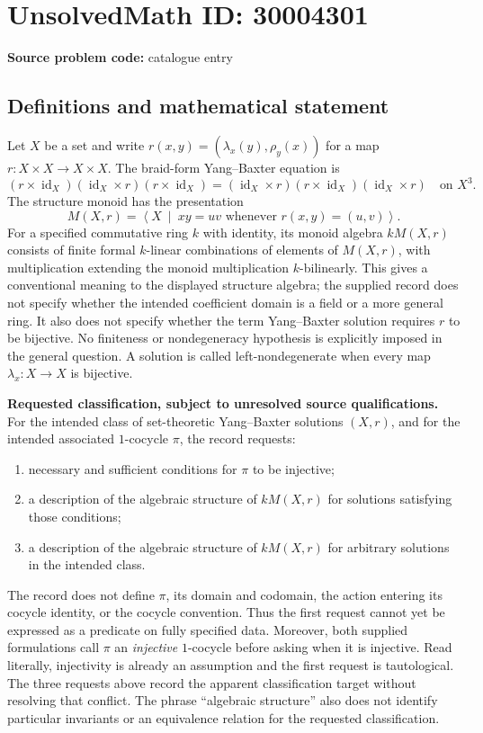 \documentclass[11pt]{article}
\begin{document}
\section*{UnsolvedMath ID: 30004301}
\textbf{Source problem code:} catalogue entry
\subsection{Definitions and mathematical statement}
Let \(X\) be a set and write \(r(x,y)=(\lambda_x(y),\rho_y(x))\) for a map \(r\colon X\times X\to X\times X\). The braid-form Yang--Baxter equation is
\[
(r\times\operatorname{id}_X)(\operatorname{id}_X\times r)(r\times\operatorname{id}_X)
=
(\operatorname{id}_X\times r)(r\times\operatorname{id}_X)(\operatorname{id}_X\times r)
\quad\text{on }X^3.
\]
The structure monoid has the presentation
\[
M(X,r)=\left\langle X\ \middle|\ xy=uv\text{ whenever }r(x,y)=(u,v)\right\rangle.
\]
For a specified commutative ring \(k\) with identity, its monoid algebra \(kM(X,r)\) consists of finite formal \(k\)-linear combinations of elements of \(M(X,r)\), with multiplication extending the monoid multiplication \(k\)-bilinearly. This gives a conventional meaning to the displayed structure algebra; the supplied record does not specify whether the intended coefficient domain is a field or a more general ring. It also does not specify whether the term Yang--Baxter solution requires \(r\) to be bijective. No finiteness or nondegeneracy hypothesis is explicitly imposed in the general question. A solution is called left-nondegenerate when every map \(\lambda_x\colon X\to X\) is bijective.

\textbf{Requested classification, subject to unresolved source qualifications.} For the intended class of set-theoretic Yang--Baxter solutions \((X,r)\), and for the intended associated \(1\)-cocycle \(\pi\), the record requests:
\begin{enumerate}
\item necessary and sufficient conditions for \(\pi\) to be injective;
\item a description of the algebraic structure of \(kM(X,r)\) for solutions satisfying those conditions;
\item a description of the algebraic structure of \(kM(X,r)\) for arbitrary solutions in the intended class.
\end{enumerate}
The record does not define \(\pi\), its domain and codomain, the action entering its cocycle identity, or the cocycle convention. Thus the first request cannot yet be expressed as a predicate on fully specified data. Moreover, both supplied formulations call \(\pi\) an \emph{injective} \(1\)-cocycle before asking when it is injective. Read literally, injectivity is already an assumption and the first request is tautological. The three requests above record the apparent classification target without resolving that conflict. The phrase ``algebraic structure'' also does not identify particular invariants or an equivalence relation for the requested classification.
\end{document}
